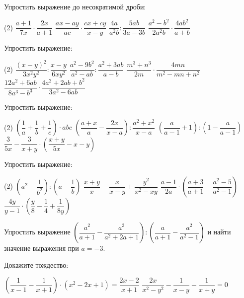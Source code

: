 \begin{class}[number=5]
	\begin{listofex}
	\item Упростить выражение до несократимой дроби:
	\begin{tasks}(2)
		\task \( \dfrac{a+1}{7x}\cdot\dfrac{2x}{a+1} \)
		\task \( \dfrac{ax-ay}{ac}\cdot\dfrac{cx+cy}{x-y} \)
		\task \( \dfrac{4a}{a^2b}:\dfrac{5ab}{3a-3b} \)
		\task \( \dfrac{a^2-b^2}{2a^2b}\cdot\dfrac{4ab^2}{a+b} \)
	\end{tasks}
	\item Упростить выражение:
	\begin{tasks}(2)
		\task \( \dfrac{(x-y)^2}{3x^2y^2}:\dfrac{x-y}{6xy^2} \)
		\task \( \dfrac{a^2-9b^2}{a^2-ab}:\dfrac{a^2+3ab}{a-b} \)
		\task \( \dfrac{m^3+n^3}{2m}\cdot\dfrac{4mn}{m^2-mn+n^2} \)
		\task \( \dfrac{12a^2+6ab}{8a^3-b^3}\cdot\dfrac{4a^2+2ab+b^2}{3a^2-6ab} \)
	\end{tasks}
	\item Упростить выражение:
	\begin{tasks}(2)
		\task \( \left( \dfrac{1}{a}+\dfrac{1}{b}+\dfrac{1}{c} \right)\cdot abc \)
		\task \( \left( \dfrac{a+x}{a}-\dfrac{2x}{x-a} \right):\dfrac{a^2+x^2}{x-a} \)
		\task \( \left( \dfrac{a}{a-1}+1 \right):\left( 1-\dfrac{a}{a-1} \right) \)
		\task \( \dfrac{3}{5x}-\dfrac{3}{x+y}\cdot\left( \dfrac{x+y}{5x}-x-y \right) \)
	\end{tasks}
	\item Упростить выражение:
	\begin{tasks}(2)
		\task \( \left( a^2-\dfrac{1}{b^2} \right):\left( a-\dfrac{1}{b} \right) \)
		\task \( \dfrac{x+y}{x}-\dfrac{x}{x-y}+\dfrac{y^2}{x^2-xy} \)
		\task \( \dfrac{a-1}{2a}\cdot\left( \dfrac{a+3}{a+1}-\dfrac{a^2-5}{a^2-1} \right) \)
		\task \( \dfrac{4y}{y-1}\cdot\left( \dfrac{y}{8}-\dfrac{1}{4}+\dfrac{1}{8y} \right) \)
	\end{tasks}
	\item Упростить выражение \( \left( \dfrac{a^2}{a+1}-\dfrac{a^3}{a^2+2a+1} \right):\left( \dfrac{a}{a+1}-\dfrac{a^2}{a^2-1} \right) \) и найти значение выражения при \( a=-3 \).
	\item Докажите тождество:
	\begin{tasks}
		\task \( \left( \dfrac{1}{x-1}-\dfrac{1}{x+1} \right)\cdot(x^2-2x+1)=\dfrac{2x-2}{x+1} \)
		\task \( \dfrac{2x}{x^2-y^2}-\dfrac{1}{x-y}-\dfrac{1}{x+y}=0 \)
	\end{tasks}
	\end{listofex}
\end{class}

